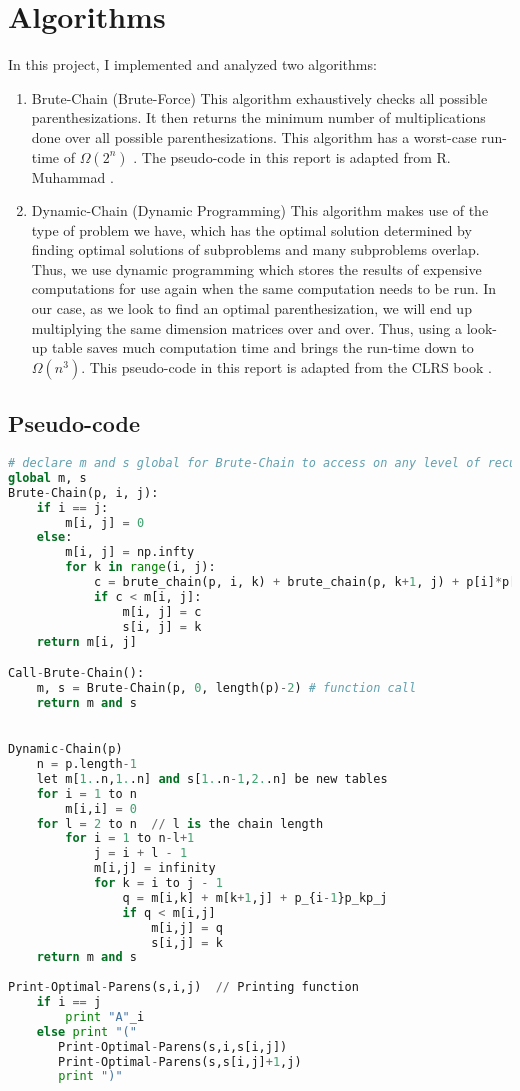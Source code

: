 \documentclass[letterpaper,titlepage]{article}
\begin{document}
\section{Algorithms}
In this project, I implemented and analyzed two algorithms:
\begin{enumerate}
    \item Brute-Chain (Brute-Force)
        \subitem This algorithm exhaustively checks all possible parenthesizations. It then returns the minimum number of multiplications done over all possible parenthesizations. This algorithm has a worst-case run-time of $\Omega(2^n)$ \cite{CLRS}. The pseudo-code in this report is adapted from R. Muhammad \cite{muhammad}.
    \item Dynamic-Chain (Dynamic Programming)
        \subitem This algorithm makes use of the type of problem we have, which has the optimal solution determined by finding optimal solutions of subproblems and many subproblems overlap. Thus, we use dynamic programming which stores the results of expensive computations for use again when the same computation needs to be run. In our case, as we look to find an optimal parenthesization, we will end up multiplying the same dimension matrices over and over. Thus, using a look-up table saves much computation time and brings the run-time down to $\Omega(n^3)$. This pseudo-code in this report is adapted from the CLRS book \cite{CLRS}.
\end{enumerate}

\subsection{Pseudo-code}
\begin{lstlisting}[language=Python]
# declare m and s global for Brute-Chain to access on any level of recursion
global m, s  
Brute-Chain(p, i, j):
    if i == j:
        m[i, j] = 0
    else:
        m[i, j] = np.infty
        for k in range(i, j):
            c = brute_chain(p, i, k) + brute_chain(p, k+1, j) + p[i]*p[k+1]*p[j+1]
            if c < m[i, j]:
                m[i, j] = c
                s[i, j] = k
    return m[i, j]

Call-Brute-Chain():
    m, s = Brute-Chain(p, 0, length(p)-2) # function call
    return m and s
        

Dynamic-Chain(p)
    n = p.length-1
    let m[1..n,1..n] and s[1..n-1,2..n] be new tables
    for i = 1 to n
        m[i,i] = 0
    for l = 2 to n  // l is the chain length
        for i = 1 to n-l+1
            j = i + l - 1
            m[i,j] = infinity
            for k = i to j - 1
                q = m[i,k] + m[k+1,j] + p_{i-1}p_kp_j
                if q < m[i,j]
                    m[i,j] = q
                    s[i,j] = k
    return m and s
    
Print-Optimal-Parens(s,i,j)  // Printing function
    if i == j
        print "A"_i
    else print "("
       Print-Optimal-Parens(s,i,s[i,j])
       Print-Optimal-Parens(s,s[i,j]+1,j)
       print ")"
            

\end{lstlisting}
\end{document}
